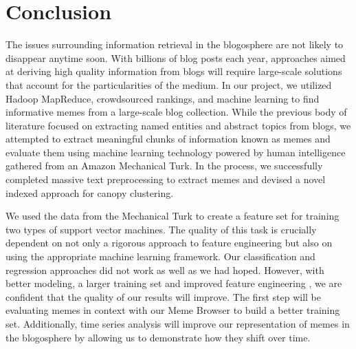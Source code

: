 \documentclass{sig-alternate}
\begin{document}
\section{Conclusion}
The issues surrounding information retrieval in the blogosphere are not likely to disappear anytime soon. With billions of blog posts each year, approaches aimed at deriving high quality information from blogs will require large-scale solutions that account for the particularities of the medium. In our project, we utilized Hadoop MapReduce, crowdsourced rankings, and machine learning to find informative memes from a large-scale blog collection. While the previous body of literature focused on extracting named entities and abstract topics from blogs, we attempted to extract meaningful chunks of information known as memes and evaluate them using machine learning technology powered by human intelligence gathered from an Amazon Mechanical Turk. In the process, we successfully completed massive text preprocessing to extract memes and devised a novel indexed approach for canopy clustering.

We used the data from the Mechanical Turk to create a feature set for training two types of support vector machines. The quality of this task is crucially dependent on not only a rigorous approach to feature engineering but also on using the appropriate machine learning framework. Our classification and regression approaches did not work as well as we had hoped. However, with better modeling, a larger training set and improved feature engineering , we are confident that the quality of our results will improve. The first step will be evaluating memes in context with our Meme Browser to build a better training set. Additionally, time series analysis will improve our representation of memes in the blogosphere by allowing us to demonstrate how they shift over time.

%

\end{document}
